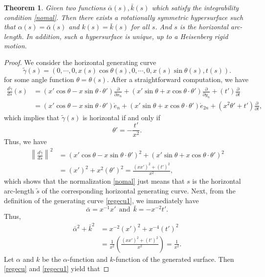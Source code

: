 \documentclass[12pt]{amsart}
\newtheorem{thm}{\bf Theorem}[section]
\theoremstyle{definition}\newtheorem{exa}[thm]{\sc Example}
\theoremstyle{definition}\newtheorem{de}[thm]{\sc Definition}
\theoremstyle{definition}\newtheorem{rem}[thm]{\sc Remark}
\theoremstyle{definition}\newtheorem{prob}[thm]{\it Problem}
\theoremstyle{definition}\newtheorem{fact}[thm]{\sc Fact}
\theoremstyle{definition}\newtheorem{claim}[thm]{\sc Claim}
\numberwithin{equation}{section}
\begin{document}
\begin{thm}\label{funthm1}
Given two functions $\bar\alpha(s),\bar{k}(s)$ which satisfy the integrability condition \eqref{nomal}.
Then there exists a rotationally symmetric hypersurface such that $\alpha(s)=\bar\alpha(s)$ and $k(s)=\bar k(s)$ for all $s$. And $s$ is the horizontal arc-length. In addition, such a hypersurface is unique, up to a Heisenberg rigid motion.
\end{thm}
\begin{proof}
We consider the horizontal generating curve 
\[\tilde{\gamma}(s)=(0,\cdots,0,x(s)\cos{\theta(s)},0,\cdots,0,x(s)\sin{\theta(s)},t(s)).\]
for some angle function $\theta=\theta(s)$. After a straightforward computation, we have
\[\begin{split}
\frac{d\tilde{\gamma}}{ds}(s)&=(x'\cos{\theta}-x\sin{\theta}\cdot\theta')\frac{\partial}{\partial x_n}+(x'\sin{\theta}+x\cos{\theta}\cdot\theta')\frac{\partial}{\partial y_n}+(t')\frac{\partial}{\partial t}\\
&=(x'\cos{\theta}-x\sin{\theta}\cdot\theta')\mathring{e}_{n}+(x'\sin{\theta}+x\cos{\theta}\cdot\theta')\mathring{e}_{2n}+(x^2\theta'+t')\frac{\partial}{\partial t},
\end{split}\]
which implies that $\tilde{\gamma}(s)$ is horizontal if and only if 
\begin{equation*}
\theta'=-\frac{t'}{x^2}.
\end{equation*}
Thus, we have
\[\begin{split}
\left\|\frac{d\tilde{\gamma}}{ds}\right\|^{2}&=(x'\cos{\theta}-x\sin{\theta}\cdot\theta')^{2}+(x'\sin{\theta}+x\cos{\theta}\cdot\theta')^{2}\\
&=(x')^{2}+x^{2}(\theta')^{2}=\frac{(xx')^2+(t')^2}{x^2},
\end{split}\]
which shows that the normalization \eqref{nomal} just means that $s$ is the horizontal arc-length $\tilde{s} $ of the corresponding horizontal generating curve. Next, from the definition of the generating curve \eqref{regecu1}, we immediately have 
\begin{equation}\label{goinf4}
\bar\alpha=x^{-1}x'\ \ \textrm{and}\ \  \bar k=-x^{-2}t'. 
\end{equation}
Thus,
\[\begin{split}
\bar\alpha^{2}+\bar k^{2}&=x^{-2}(x')^{2}+x^{-4}(t')^{2}\\
&=\frac{1}{x^2}\left(\frac{(xx')^{2}+(t')^{2}}{x^{2}}\right)=\frac{1}{x^2}.
\end{split}\]
Let $\alpha$ and $k$ be the $\alpha$-function and $k$-function of the generated surface. Then \eqref{regecu} and \eqref{regecu1} yield that

\end{proof}
\end{document}
